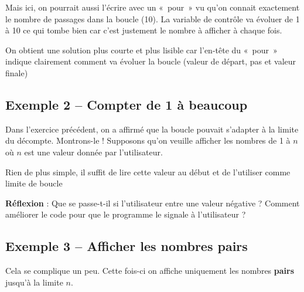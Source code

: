 		Mais ici, on pourrait aussi l'écrire avec un «~pour~» vu qu'on
		connait exactement le nombre de passages dans la boucle (10). 
		La variable de contrôle va évoluer de 1 à 10 ce qui tombe bien car
		c'est justement le nombre à afficher à chaque fois.


		On obtient une solution plus courte et plus lisible 
		car l'en-tête du «~pour~» indique clairement
		comment va évoluer la boucle
		(valeur de départ, pas et valeur finale)

	\subsection{Exemple 2 -- Compter de 1 à beaucoup}

		Dans l'exercice précédent, on a
		affirmé que la boucle pouvait s'adapter à la limite du
		décompte. Montrons-le ! Supposons qu'on veuille
		afficher les nombres de 1 à $n$ où $n$ est une valeur 
		donnée par l'utilisateur.

		Rien de plus simple, il suffit de lire cette
		valeur au début et de l'utiliser comme limite de boucle


		\textbf{Réflexion} : Que se passe-t-il si l'utilisateur entre une valeur négative ?
		Comment améliorer le code pour que le programme
		le signale à l'utilisateur ?

	\subsection{Exemple 3 -- Afficher les nombres pairs}

		Cela se complique un peu. Cette fois-ci on
		affiche uniquement les nombres \textbf{pairs} jusqu'à la limite $n$.
		
